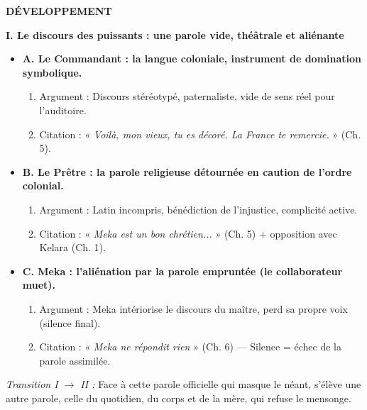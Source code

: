 \documentclass[11pt]{article}
\begin{document}
\begin{exoresolu}
\textbf{DÉVELOPPEMENT}

\textbf{I. Le discours des puissants : une parole vide, théâtrale et aliénante}
\begin{itemize}
    \item \textbf{A. Le Commandant : la langue coloniale, instrument de domination symbolique.}
    \begin{enumerate}
        \item Argument : Discours stéréotypé, paternaliste, vide de sens réel pour l'auditoire.
        \item Citation : « \emph{Voilà, mon vieux, tu es décoré. La France te remercie.} » (Ch. 5).
    \end{enumerate}
    \item \textbf{B. Le Prêtre : la parole religieuse détournée en caution de l'ordre colonial.}
    \begin{enumerate}
        \item Argument : Latin incompris, bénédiction de l'injustice, complicité active.
        \item Citation : « \emph{Meka est un bon chrétien...} » (Ch. 5) + opposition avec Kelara (Ch. 1).
    \end{enumerate}
    \item \textbf{C. Meka : l'aliénation par la parole empruntée (le collaborateur muet).}
    \begin{enumerate}
        \item Argument : Meka intériorise le discours du maître, perd sa propre voix (silence final).
        \item Citation : « \emph{Meka ne répondit rien} » (Ch. 6) — Silence = échec de la parole assimilée.
    \end{enumerate}
\end{itemize}

\textit{Transition I $\to$ II :} Face à cette parole officielle qui masque le néant, s'élève une autre parole, celle du quotidien, du corps et de la mère, qui refuse le mensonge.


\end{exoresolu}
\end{document}
